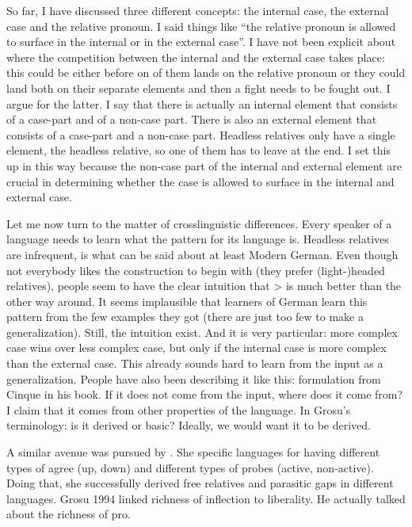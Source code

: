 So far, I have discussed three different concepts: the internal case, the external case and the relative pronoun. I said things like ``the relative pronoun is allowed to surface in the internal or in the external case''. I have not been explicit about where the competition between the internal and the external case takes place: this could be either before on of them lands on the relative pronoun or they could land both on their separate elements and then a fight needs to be fought out. I argue for the latter. I say that there is actually an internal element that consists of a case-part and of a non-case part. There is also an external element that consists of a case-part and a non-case part. Headless relatives only have a single element, the headless relative, so one of them has to leave at the end. I set this up in this way because the non-case part of the internal and external element are crucial in determining whether the case is allowed to surface in the internal and external case.




Let me now turn to the matter of crosslinguistic differences. Every speaker of a language needs to learn what the pattern for its language is. Headless relatives are infrequent, is what can be said about at least Modern German. Even though not everybody likes the construction to begin with (they prefer (light-)headed relatives), people seem to have the clear intuition that > is much better than the other way around. It seems implausible that learners of German learn this pattern from the few examples they got (there are just too few to make a generalization). Still, the intuition exist. And it is very particular: more complex case wins over less complex case, but only if the internal case is more complex than the external case. This already sounds hard to learn from the input as a generalization. People have also been describing it like this: formulation from Cinque in his book. If it does not come from the input, where does it come from? I claim that it comes from other properties of the language. In Grosu's terminology: is it derived or basic? Ideally, we would want it to be derived.

A similar avenue was pursued by \citealt{himmelreich2017}. She specific languages for having different types of agree (up, down) and different types of probes (active, non-active). Doing that, she successfully derived free relatives and parasitic gaps in different languages. Grosu 1994 linked richness of inflection to liberality. He actually talked about the richness of pro.

